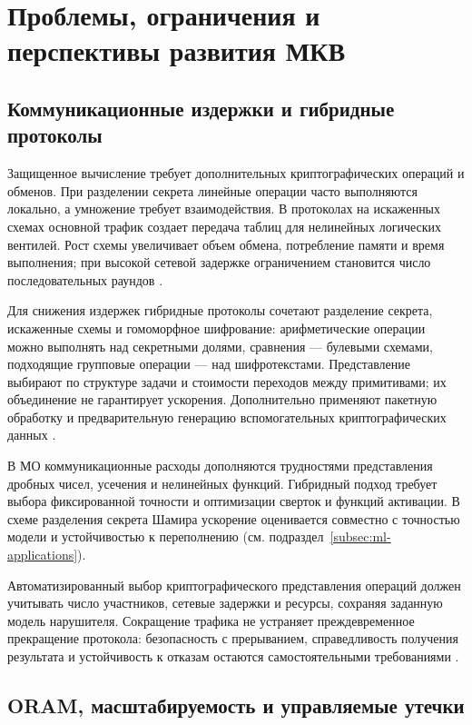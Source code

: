 \section{Проблемы, ограничения и перспективы развития МКВ}
\label{sec:limitations}

\subsection{Коммуникационные издержки и гибридные протоколы}
\label{subsec:communication}

Защищенное вычисление требует дополнительных криптографических операций и обменов. При разделении секрета линейные операции часто выполняются локально, а умножение требует взаимодействия. В протоколах на искаженных схемах основной трафик создает передача таблиц для нелинейных логических вентилей. Рост схемы увеличивает объем обмена, потребление памяти и время выполнения; при высокой сетевой задержке ограничением становится число последовательных раундов \cite{06}.

Для снижения издержек гибридные протоколы сочетают разделение секрета, искаженные схемы и гомоморфное шифрование: арифметические операции можно выполнять над секретными долями, сравнения --- булевыми схемами, подходящие групповые операции --- над шифротекстами. Представление выбирают по структуре задачи и стоимости переходов между примитивами; их объединение не гарантирует ускорения. Дополнительно применяют пакетную обработку и предварительную генерацию вспомогательных криптографических данных \cite{06}\cite{08}.

В МО коммуникационные расходы дополняются трудностями представления дробных чисел, усечения и нелинейных функций. Гибридный подход требует выбора фиксированной точности и оптимизации сверток и функций активации. В схеме разделения секрета Шамира \cite{12} ускорение оценивается совместно с точностью модели и устойчивостью к переполнению (см. подраздел~\ref{subsec:ml-applications}).

Автоматизированный выбор криптографического представления операций должен учитывать число участников, сетевые задержки и ресурсы, сохраняя заданную модель нарушителя. Сокращение трафика не устраняет преждевременное прекращение протокола: безопасность с прерыванием, справедливость получения результата и устойчивость к отказам остаются самостоятельными требованиями \cite{08}.

\subsection{ORAM, масштабируемость и управляемые утечки}
\label{subsec:oram}


